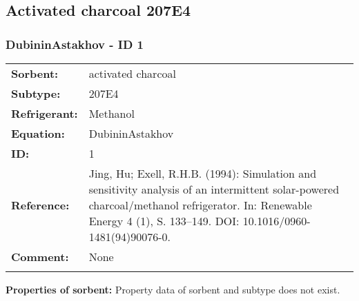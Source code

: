 \subsection{Activated charcoal 207E4}
%
\subsubsection{DubininAstakhov - ID 1}
%
\begin{tabular}[l]{|lp{11.5cm}|}
\hline
\addlinespace

\textbf{Sorbent:} & activated charcoal \\
\textbf{Subtype:} & 207E4 \\
\textbf{Refrigerant:} & Methanol \\
\textbf{Equation:} & DubininAstakhov \\
\textbf{ID:} & 1 \\
\textbf{Reference:} & Jing, Hu; Exell, R.H.B. (1994): Simulation and sensitivity analysis of an intermittent solar-powered charcoal/methanol refrigerator. In: Renewable Energy 4 (1), S. 133–149. DOI: 10.1016/0960-1481(94)90076-0. \\
\textbf{Comment:} & None \\

\addlinespace
\hline
\end{tabular}
\newline

\textbf{Properties of sorbent:}
\newline
%
Property data of sorbent and subtype does not exist.

